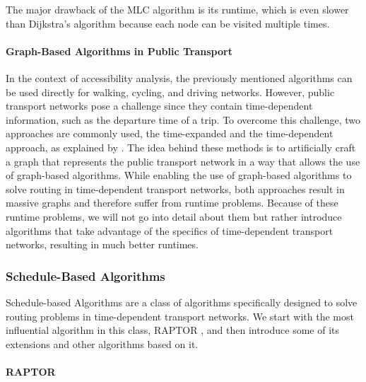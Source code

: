 The major drawback of the MLC algorithm is its runtime, which is even slower than Dijkstra's algorithm because each node can be visited multiple times.


\paragraph{Graph-Based Algorithms in Public Transport}
\label{subsubsec:graph_based_algorithms_in_public_transport}


In the context of accessibility analysis, the previously mentioned algorithms can be used directly for walking, cycling, and driving networks.
However, public transport networks pose a challenge since they contain time-dependent information, such as the departure time of a trip.
To overcome this challenge, two approaches are commonly used, the time-expanded and the time-dependent approach, as explained by .
The idea behind these methods is to artificially craft a graph that represents the public transport network in a way that allows the use of graph-based algorithms.
While enabling the use of graph-based algorithms to solve routing in time-dependent transport networks, both approaches result in massive graphs and therefore suffer from runtime problems. 
Because of these runtime problems, we will not go into detail about them but rather introduce algorithms that take advantage of the specifics of time-dependent transport networks, resulting in much better runtimes.

\subsubsection{Schedule-Based Algorithms}

Schedule-based Algorithms are a class of algorithms specifically designed to solve routing problems in time-dependent transport networks.
We start with the most influential algorithm in this class, RAPTOR , and then introduce some of its extensions and other algorithms based on it.

\paragraph{RAPTOR}
\label{subsubsec:raptor}

